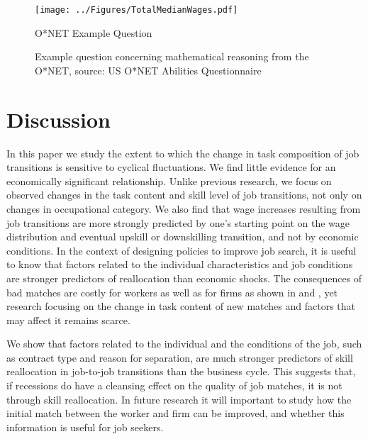 \documentclass[11pt, oneside]{article}
\begin{document}
	
	
	
		\newpage
	\begin{figure}[t]
	\centering
	\texttt{[image: ../Figures/TotalMedianWages.pdf]}
	\caption{O*NET Example Question}
	\caption*{\small{Example question concerning mathematical reasoning from the O*NET, source: US O*NET Abilities Questionnaire}}
	\label{fig:totalMedianWages}
\end{figure}		

	\section{Discussion}
	\label{sec:Conclusion}
	
	In this paper we study the extent to which the change in task composition of job transitions is sensitive to cyclical fluctuations. We find little evidence for an economically significant relationship. Unlike previous research, we focus on observed changes in the task content and skill level of job transitions, not only on changes in occupational category.  We also find that wage increases resulting from job transitions are more strongly predicted by one's starting point on the wage distribution and eventual upskill or downskilling transition, and not by economic conditions. In the context of designing policies to improve job search, it is useful to know that factors related to the individual characteristics and job conditions are stronger predictors of reallocation than economic shocks. The consequences of bad matches are costly for workers as well as for firms as shown in \cite{Fredriksson2018} and \cite{Guvenen2015}, yet research focusing on the change in task content of new matches and factors that may affect it remains scarce. 
	
	\vspace{2mm}
	
	We show that factors related to the individual and the conditions of the job, such as contract type and reason for separation, are much stronger predictors of skill reallocation in job-to-job transitions than the business cycle. This suggests that, if recessions do have a cleansing effect on the quality of job matches, it is not through skill reallocation.
	In future research it will important to study how the initial match between the worker and firm can be improved, and whether this information is useful for job seekers. 
	
\end{document}
